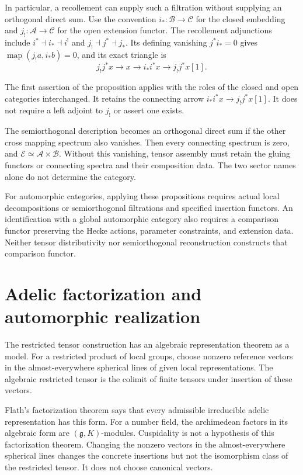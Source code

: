 In particular, a recollement can supply such a filtration without
supplying an orthogonal direct sum. Use the convention
$i_*:\mathcal B\to\mathcal C$ for the closed embedding and
$j_!:\mathcal A\to\mathcal C$ for the open extension functor.
The recollement adjunctions include $i^*\dashv i_*\dashv i^!$ and
$j_!\dashv j^*\dashv j_*$. Its defining vanishing $j^*i_*=0$ gives
$\operatorname{map}(j_!a,i_*b)=0$, and its exact triangle is
\[
 j_!j^*x\longrightarrow x\longrightarrow i_*i^*x
               \longrightarrow j_!j^*x[1].
\]

The first assertion of the proposition applies with the roles of the
closed and open categories interchanged. It retains the connecting
arrow $i_*i^*x\to j_!j^*x[1]$. It does not require a left adjoint to
$j_!$ or assert one exists.

The semiorthogonal description becomes an orthogonal direct sum if the
other cross mapping spectrum also vanishes. Then every connecting
spectrum is zero, and $\mathcal E\simeq\mathcal A\times\mathcal B$.
Without this vanishing, tensor assembly must retain the gluing functors
or connecting spectra and their composition data. The two sector names
alone do not determine the category.

For automorphic categories, applying these propositions requires actual
local decompositions or semiorthogonal filtrations and specified
insertion functors. An identification with a global automorphic category
also requires a comparison functor preserving the Hecke actions,
parameter constraints, and extension data. Neither tensor distributivity
nor semiorthogonal reconstruction constructs that comparison functor.


\section{Adelic factorization and automorphic realization}
\label{v4-arith:ic:adelic}

The restricted tensor construction has an algebraic representation
theorem as a model. For a restricted product of local groups, choose
nonzero reference vectors in the almost-everywhere spherical lines
of given local representations. The algebraic restricted tensor
is the colimit of finite tensors under insertion of these vectors.

Flath's factorization theorem says that every admissible
irreducible adelic representation has this form.
For a number field, the archimedean factors in its algebraic
form are \((\mathfrak g,K)\)-modules.
Cuspidality is not a hypothesis of this factorization theorem.
Changing the nonzero vectors in the almost-everywhere spherical
lines changes the concrete insertions but not the isomorphism
class of the restricted tensor.
It does not choose canonical vectors.

